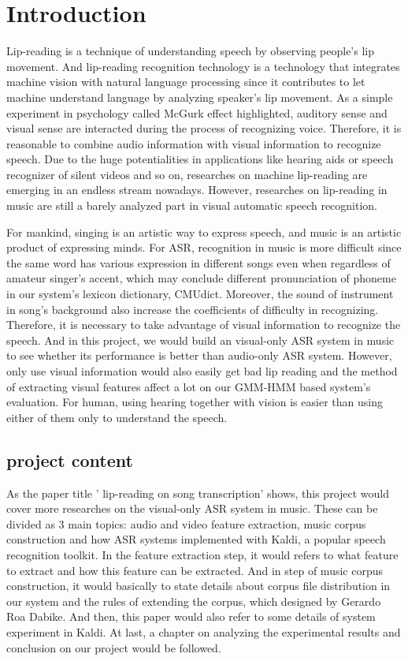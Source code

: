 \chapter{Introduction}
Lip-reading is a technique of understanding speech by observing people's lip movement. And lip-reading recognition technology is a technology that integrates machine vision with natural language processing since it contributes to let machine understand language by analyzing speaker’s lip movement. As a simple experiment in psychology called McGurk effect\cite{Reference2} highlighted, auditory sense and visual sense are interacted during the process of recognizing voice. Therefore, it is reasonable to combine audio information with visual information to recognize speech. Due to the huge potentialities in applications like hearing aids or speech recognizer of silent videos and so on, researches on machine lip-reading are emerging in an endless stream nowadays. However, researches on lip-reading in music are still a barely analyzed part in visual automatic speech recognition. 

For mankind, singing is an artistic way to express speech, and music is an artistic product of expressing minds. For ASR, recognition in music is more difficult since the same word has various expression in different songs even when regardless of amateur singer's accent, which may conclude different pronunciation of phoneme in our system's lexicon dictionary, CMUdict\cite{Reference3}. Moreover, the sound of instrument in song's background also increase the coefficients of difficulty in recognizing. Therefore, it is necessary to take advantage of visual information to recognize the speech. And in this project, we would build an visual-only ASR system in music to see whether its performance is better than audio-only ASR system. However, only use visual information would also easily get bad lip reading\cite{1} and the method of extracting visual features affect a lot on our GMM-HMM based system's evaluation. For human, using hearing together with vision is easier than using either of them only to understand the speech. 


\section{project content}

As the paper title ' lip-reading on song transcription' shows, this project would cover more researches on the visual-only ASR system in music. These can be divided as 3 main topics:  audio and video feature extraction,  music corpus construction and how ASR systems implemented with Kaldi\cite{Reference4}, a popular speech recognition toolkit.  In the feature extraction step,  it would refers to what feature to extract and how this feature can be extracted. And in step of  music corpus construction, it would basically to state details about corpus file distribution in our system and the rules of extending the corpus, which designed by Gerardo Roa Dabike\cite{Reference1}. And then,  this paper would also refer to some details of system experiment in Kaldi.  At last, a chapter on analyzing the experimental results and conclusion on our project would be followed.

